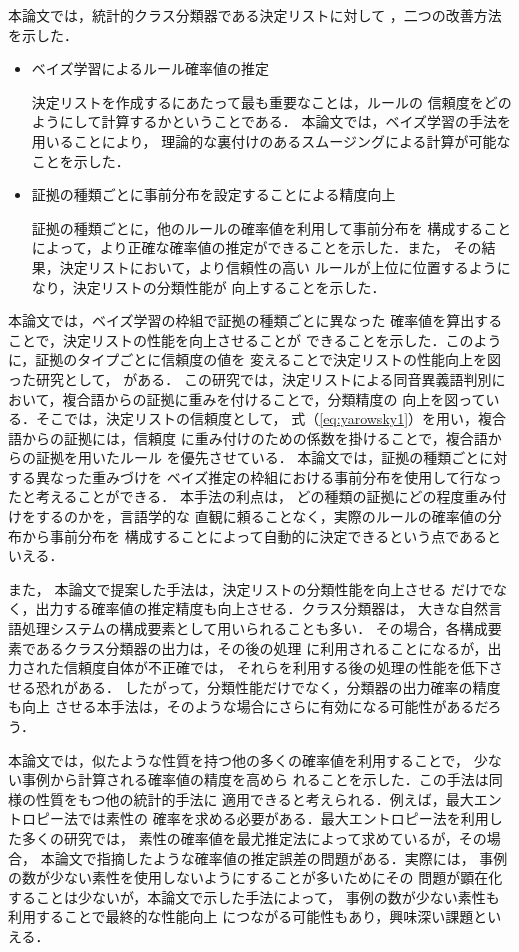 本論文では，統計的クラス分類器である決定リストに対して
，二つの改善方法を示した．

\begin{itemize}
\item
ベイズ学習によるルール確率値の推定

決定リストを作成するにあたって最も重要なことは，ルールの
信頼度をどのようにして計算するかということである．
本論文では，ベイズ学習の手法を用いることにより，
理論的な裏付けのあるスムージングによる計算が可能なことを示した．

\item
証拠の種類ごとに事前分布を設定することによる精度向上

証拠の種類ごとに，他のルールの確率値を利用して事前分布を
構成することによって，より正確な確率値の推定ができることを示した．また，
その結果，決定リストにおいて，より信頼性の高い
ルールが上位に位置するようになり，決定リストの分類性能が
向上することを示した．

\end{itemize}

本論文では，ベイズ学習の枠組で証拠の種類ごとに異なった
確率値を算出することで，決定リストの性能を向上させることが
できることを示した．このように，証拠のタイプごとに信頼度の値を
変えることで決定リストの性能向上を図った研究として，
\cite{新納:複合語}がある．
この研究では，決定リストによる同音異義語判別に
おいて，複合語からの証拠に重みを付けることで，分類精度の
向上を図っている．そこでは，決定リストの信頼度として，
式（\ref{eq:yarowsky1}）を用い，複合語からの証拠には，信頼度
に重み付けのための係数を掛けることで，複合語からの証拠を用いたルール
を優先させている．
本論文では，証拠の種類ごとに対する異なった重みづけを
ベイズ推定の枠組における事前分布を使用して行なったと考えることができる．
本手法の利点は，
どの種類の証拠にどの程度重み付けをするのかを，言語学的な
直観に頼ることなく，実際のルールの確率値の分布から事前分布を
構成することによって自動的に決定できるという点であるといえる．

また，
本論文で提案した手法は，決定リストの分類性能を向上させる
だけでなく，出力する確率値の推定精度も向上させる．クラス分類器は，
大きな自然言語処理システムの構成要素として用いられることも多い．
その場合，各構成要素であるクラス分類器の出力は，その後の処理
に利用されることになるが，出力された信頼度自体が不正確では，
それらを利用する後の処理の性能を低下させる恐れがある．
したがって，分類性能だけでなく，分類器の出力確率の精度も向上
させる本手法は，そのような場合にさらに有効になる可能性があるだろう．

本論文では，似たような性質を持つ他の多くの確率値を利用することで，
少ない事例から計算される確率値の精度を高めら
れることを示した．この手法は同様の性質をもつ他の統計的手法に
適用できると考えられる．例えば，最大エントロピー法では素性の
確率を求める必要がある．最大エントロピー法を利用した多くの研究では，
素性の確率値を最尤推定法によって求めているが，その場合，
本論文で指摘したような確率値の推定誤差の問題がある．実際には，
事例の数が少ない素性を使用しないようにすることが多いためにその
問題が顕在化することは少ないが，本論文で示した手法によって，
事例の数が少ない素性も利用することで最終的な性能向上
につながる可能性もあり，興味深い課題といえる．




